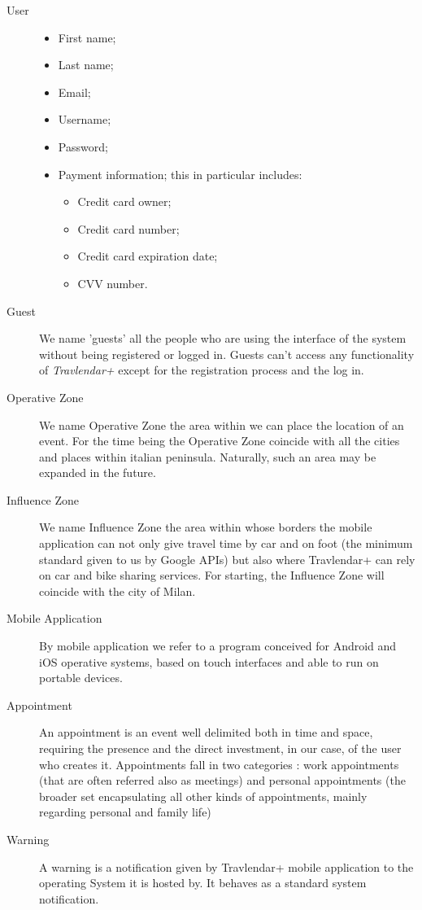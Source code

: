 \begin{description}
				\item[User] 
				\begin{itemize}
					\item First name;
					\item Last name; 
					\item Email;
					\item Username;
					\item Password;
					\item Payment information; this in particular includes:
						\begin{itemize}
							\item Credit card owner;
							\item Credit card number;
							\item Credit card expiration date;
							\item CVV number.
						\end{itemize}
				\end{itemize}
				
				\item[Guest] We name 'guests' all the people who are using the interface of the system without being registered or logged in. Guests can't access any functionality of \textit{Travlendar+} except for the registration process and the log in. 
				\item[Operative Zone] We name Operative Zone the area within we can place the location of an event. For the time being the Operative Zone coincide with all the cities and places within italian peninsula. Naturally, such an area may be expanded in the future.
				\item[Influence Zone] We name Influence Zone the area within whose borders the mobile application can not only give travel time by car and on foot (the minimum standard given to us by Google APIs) but also where Travlendar+ can rely on car and bike sharing services. For starting, the Influence Zone will coincide with the city of Milan.
				\item[Mobile Application] By mobile application we refer to a program conceived for Android and iOS operative systems, based on touch interfaces and able to run on portable devices.
				\item[Appointment] An appointment is an event well delimited both in time and space, requiring the presence and the direct investment, in our case, of the user who creates it. Appointments fall in two categories : work appointments (that are often referred also as meetings) and personal appointments (the broader set encapsulating all other kinds of appointments, mainly regarding personal and family life)
				\item[Warning] A warning is a notification given by Travlendar+ mobile application to the operating System it is hosted by. It behaves as a standard system notification.
\end{description}
